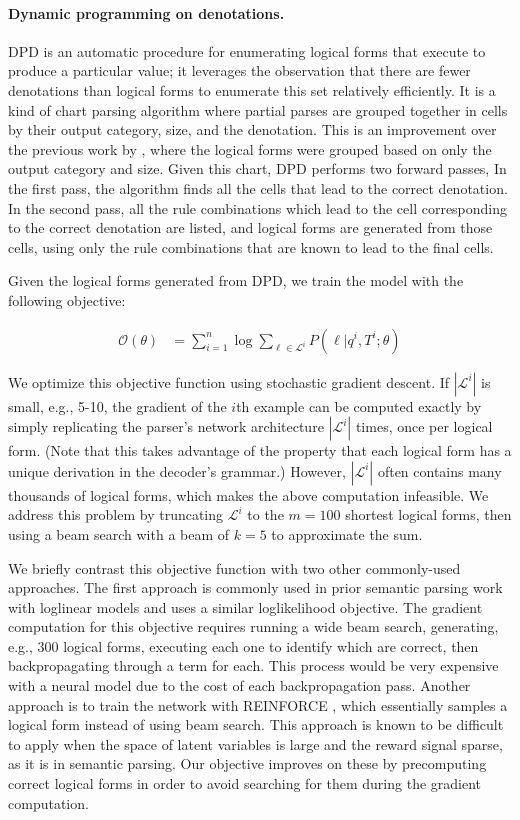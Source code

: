 \paragraph{Dynamic programming on denotations.} DPD is an automatic procedure for enumerating 
logical forms that execute to produce a particular value; it leverages the 
observation that there are fewer denotations than logical forms to enumerate 
this set relatively efficiently. It is a kind of chart parsing algorithm where
partial parses are grouped together in cells by their output category, size, and
the denotation. This is an improvement over the previous work by \cite{pasupat2015compositional},
where the logical forms were grouped based on only the output category and size.
Given this chart, DPD performs two forward passes, In the first pass, the algorithm
finds all the cells that lead to the correct denotation. In the second pass, all the
rule combinations which lead to the cell corresponding to the correct denotation
are listed, and logical forms are generated from those cells, using only the rule combinations
that are known to lead to the final cells.

Given the logical forms generated from DPD, we train the model 
with the following objective: 

\begin{align}
    \mathcal{O}(\theta) & = \sum_{i=1}^n \log \sum_{\ell \in \mathcal{L}^i} 
P(\ell | q^i, T^i; \theta )
\end{align}

We optimize this objective function using stochastic gradient descent.
If $|\mathcal{L}^i|$ is small, e.g., 5-10, the gradient of the $i$th example 
can 
be computed exactly by simply replicating the parser's network architecture 
$|\mathcal{L}^i|$ times, once per logical form.
(Note that this takes advantage of the property that each logical form has a 
unique derivation in the decoder's grammar.)
However, $|\mathcal{L}^i|$ often contains many thousands of logical forms, 
which 
makes the above computation infeasible. We address this problem by truncating 
$\mathcal{L}^i$ to the $m=100$ shortest logical forms, then using a beam search 
with a beam of $k=5$ to approximate the sum.

We briefly contrast this objective function with two other commonly-used 
approaches. The first approach is commonly used in prior semantic parsing work 
with loglinear models \citep{Liang2011LearningDC,pasupat2015compositional} and 
uses a similar 
loglikelihood objective. The gradient computation for this objective requires 
running a wide beam search, generating, e.g., 300 logical forms, executing each 
one to identify which are correct, then backpropagating through a term for 
each. 
This process would be very expensive with a neural model due to the cost of 
each 
backpropagation pass. Another approach is to train the network with REINFORCE 
\citep{williams1992simple}, which essentially samples a logical form instead of 
using 
beam search. This approach is known to be difficult to apply when the space of 
latent variables is large and the reward signal sparse, as it is in semantic 
parsing. Our objective improves on these by precomputing correct logical forms 
in order 
to avoid searching for them during the gradient computation.

